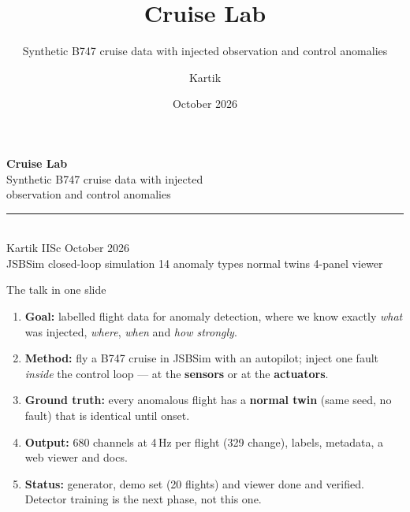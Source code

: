 \documentclass[aspectratio=169,11pt]{beamer}
\title{Cruise Lab}
\subtitle{Synthetic B747 cruise data with injected observation and control anomalies}
\author{Kartik}
\institute{IISc}
\date{October 2026}
\newcommand{\obs}[1]{{\color{flight}\textbf{#1}}}
\newcommand{\ctl}[1]{{\color{twin}\textbf{#1}}}
\newcommand{\aside}[1]{{\color{muted}\small #1}}
\begin{document}
\begin{frame}[plain]
  \vspace{2.5em}
  {\Huge\bfseries Cruise Lab}\\[0.6em]
  {\Large Synthetic B747 cruise data with injected\\ observation and control anomalies}\\[1.4em]
  {\color{flight}\rule{3cm}{2pt}}\\[1em]
  Kartik \quad\textbullet\quad IISc \quad\textbullet\quad October 2026\\[2.5em]
  \aside{JSBSim closed-loop simulation \textbullet{} 14 anomaly types \textbullet{} normal twins \textbullet{} 4-panel viewer}
\end{frame}

\begin{frame}{The talk in one slide}
  \begin{enumerate}\setlength\itemsep{0.7em}
    \item \textbf{Goal:} labelled flight data for anomaly detection, where we know exactly \emph{what} was injected, \emph{where}, \emph{when} and \emph{how strongly}.
    \item \textbf{Method:} fly a B747 cruise in JSBSim with an autopilot; inject one fault \emph{inside} the control loop --- at the \obs{sensors} or at the \ctl{actuators}.
    \item \textbf{Ground truth:} every anomalous flight has a \textbf{normal twin} (same seed, no fault) that is identical until onset.
    \item \textbf{Output:} 680 channels at 4\,Hz per flight (329 change), labels, metadata, a web viewer and docs.
    \item \textbf{Status:} generator, demo set (20 flights) and viewer done and verified. Detector training is the next phase, not this one.
  \end{enumerate}
\end{frame}
\end{document}
